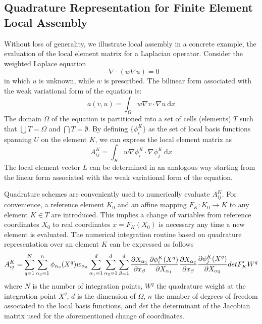 \subsection{Quadrature Representation for Finite Element Local Assembly}
\label{sec:quadrature-rep}
Without loss of generality, we illustrate local assembly in a concrete example, the evaluation of the local element matrix for a Laplacian operator. Consider the weighted Laplace equation
\begin{equation}
- \nabla \cdot (w \nabla u) = 0
\end{equation}
in which $u$ is unknown, while $w$ is prescribed. The bilinear form associated with the weak variational form of the equation is:
\begin{equation}
a(v, u) = \int_\Omega w \nabla v \cdot \nabla u\ \mathrm{d}x
\end{equation}
The domain $\Omega$ of the equation is partitioned into a set of cells (elements) $T$ such that $\bigcup T = \Omega$ and $\bigcap T = \emptyset$. By defining $\lbrace \phi_i^K \rbrace$ as the set of local basis functions spanning $U$ on the element $K$, we can express the local element matrix as
\begin{equation}
\label{eq:stiffness}
A_{ij}^K = \int_K w \nabla \phi_i^K \cdot \nabla \phi_j^K\ \mathrm{d}x
\end{equation}
The local element vector $L$ can be determined in an analogous way starting from the linear form associated with the weak variational form of the equation. 

Quadrature schemes are conveniently used to numerically evaluate $A_{ij}^K$. For convenience, a reference element $K_0$ and an affine mapping $F_K : K_0 \rightarrow K$ to any element $K \in T$ are introduced. This implies a change of variables from reference coordinates $X_0$ to real coordinates $x = F_K (X_0)$ is necessary any time a new element is evaluated. The numerical integration routine based on quadrature representation over an element $K$ can be expressed as follows
\begin{equation}
\label{eq:quadrature}
\scriptsize
A_{ij}^K = \sum_{q=1}^N \sum_{\alpha_3=1}^n \phi_{\alpha_3}(X^q)w_{\alpha_3} \sum_{\alpha_1=1}^d \sum_{\alpha_2=1}^d \sum_{\beta=1}^d \frac{\partial X_{\alpha_1}}{\partial x_{\beta}} \frac{\partial \phi_i^K(X^q)}{\partial X_{\alpha_1}} \frac{\partial X_{\alpha_2}}{\partial x_{\beta}} \frac{\partial \phi_j^K(X^q)}{\partial X_{\alpha_2}} det F_K' W^q
\end{equation}
where $N$ is the number of integration points, $W^q$ the quadrature weight at the integration point $X^q$, $d$ is the dimension of $\Omega$, $n$ the number of degrees of freedom associated to the local basis functions, and $det$ the determinant of the Jacobian matrix used for the aforementioned change of coordinates.  


